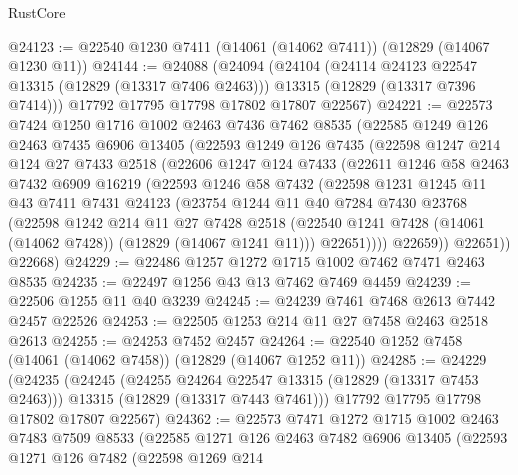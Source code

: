 \begin{lexlean}{RustCore}
\begin{coremodule}
@24123 := @22540 @1230 @7411 (@14061 (@14062 @7411)) (@12829 (@14067 @1230 @11))
@24144 := @24088
    (@24094
      (@24104
        (@24114 @24123 @22547 @13315 (@12829 (@13317 @7406 @2463)))
        @13315
        (@12829 (@13317 @7396 @7414)))
      @17792
      @17795
      @17798
      @17802
      @17807
      @22567)
@24221 := @22573
    @7424
    @1250
    @1716
    @1002
    @2463
    @7436
    @7462
    @8535
    (@22585
      @1249
      @126
      @2463
      @7435
      @6906
      @13405
      (@22593
        @1249
        @126
        @7435
        (@22598
          @1247
          @214
          @124
          @27
          @7433
          @2518
          (@22606
            @1247
            @124
            @7433
            (@22611
              @1246
              @58
              @2463
              @7432
              @6909
              @16219
              (@22593
                @1246
                @58
                @7432
                (@22598
                  @1231
                  @1245
                  @11
                  @43
                  @7411
                  @7431
                  @24123
                  (@23754
                    @1244
                    @11
                    @40
                    @7284
                    @7430
                    @23768
                    (@22598
                      @1242
                      @214
                      @11
                      @27
                      @7428
                      @2518
                      (@22540 @1241 @7428 (@14061 (@14062 @7428)) (@12829 (@14067 @1241 @11)))
                      @22651))))
              @22659))
          @22651))
      @22668)
@24229 := @22486 @1257 @1272 @1715 @1002 @7462 @7471 @2463 @8535
@24235 := @22497 @1256 @43 @13 @7462 @7469 @4459
@24239 := @22506 @1255 @11 @40 @3239
@24245 := @24239 @7461 @7468 @2613 @7442 @2457 @22526
@24253 := @22505 @1253 @214 @11 @27 @7458 @2463 @2518 @2613
@24255 := @24253 @7452 @2457
@24264 := @22540 @1252 @7458 (@14061 (@14062 @7458)) (@12829 (@14067 @1252 @11))
@24285 := @24229
    (@24235
      (@24245
        (@24255 @24264 @22547 @13315 (@12829 (@13317 @7453 @2463)))
        @13315
        (@12829 (@13317 @7443 @7461)))
      @17792
      @17795
      @17798
      @17802
      @17807
      @22567)
@24362 := @22573
    @7471
    @1272
    @1715
    @1002
    @2463
    @7483
    @7509
    @8533
    (@22585
      @1271
      @126
      @2463
      @7482
      @6906
      @13405
      (@22593
        @1271
        @126
        @7482
        (@22598
          @1269
          @214

\end{coremodule}
\end{lexlean}
